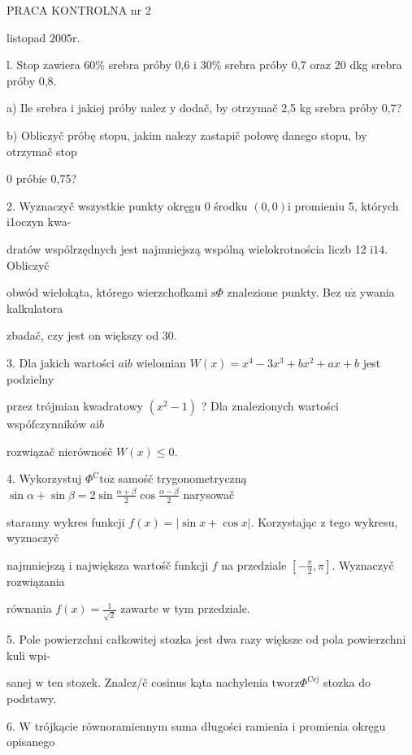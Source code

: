 \documentclass[a4paper,12pt]{article}
\begin{document}
PRACA KONTROLNA nr 2

listopad $2005\mathrm{r}.$

l. Stop zawiera 60\% srebra próby 0,6 $\mathrm{i}$ 30\% srebra próby 0,7 oraz 20 dkg srebra próby 0,8.

a) Ile srebra $\mathrm{i}$ jakiej próby nalez $\mathrm{y}$ dodač, by otrzymač 2,5 kg srebra próby 0,7?

b) Obliczyč próbę stopu, jakim nalezy zastapič połowę danego stopu, by otrzymač stop

$0$ próbie 0,75?

2. Wyznaczyč wszystkie punkty okręgu $0$ środku $(0,0)\mathrm{i}$ promieniu 5, których i1oczyn kwa-

dratów wspólrzędnych jest najmniejszą wspólną wielokrotnościa liczb 12 $\mathrm{i} 14$. Obliczyč

obwód wielokąta, którego wierzchofkami $\mathrm{s}\Phi$ znalezione punkty. Bez $\mathrm{u}\dot{\mathrm{z}}$ ywania kalkulatora

zbadač, czy jest on większy od 30.

3. Dla jakich wartości $a \mathrm{i} b$ wielomian $W(x) = x^{4}-3x^{3}+bx^{2}+ax+b$ jest podzielny

przez trójmian kwadratowy $(x^{2}-1)$ ? Dla znalezionych wartości wspófczynników $a\mathrm{i}b$

rozwiązač nierównośč $W(x)\leq 0.$

4. Wykorzystuj $\Phi^{\mathrm{C}}\mathrm{t}\mathrm{o}\dot{\mathrm{z}}$ samośč trygonometryczną $\displaystyle \sin\alpha+\sin\beta=2\sin\frac{\alpha+\beta}{2}\cos\frac{\alpha-\beta}{2}$ narysowač

staranny wykres funkcji $f(x)=|\sin x+\cos x|$. Korzystając $\mathrm{z}$ tego wykresu, wyznaczyč

najmniejszą $\mathrm{i}$ największa wartośč funkcji $f$ na przedziale $[-\displaystyle \frac{\pi}{2},\pi]$. Wyznaczyč rozwiązania

równania $f(x)=\displaystyle \frac{1}{\sqrt{2}}$ zawarte $\mathrm{w}$ tym przedziale.

5. Pole powierzchni całkowitej stozka jest dwa razy większe od pola powierzchni kuli wpi-

sanej $\mathrm{w}$ ten stozek. Znalez/č cosinus kąta nachylenia $\mathrm{t}\mathrm{w}\mathrm{o}\mathrm{r}\mathrm{z}\Phi^{\mathrm{C}\mathrm{e}\mathrm{j}}$ stozka do podstawy.

6. $\mathrm{W}$ trójkącie równoramiennym suma długości ramienia $\mathrm{i}$ promienia okręgu opisanego
\end{document}
